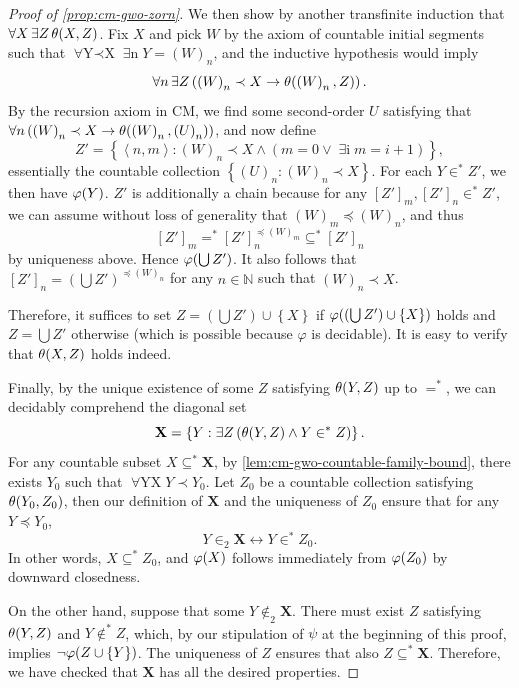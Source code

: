 \documentclass[12pt,openany]{book}
\theoremstyle{plain}
\theoremstyle{definition}
\newcommand\tuple[1]{\left\langle #1 \right\rangle}
\newcommand\opA[1]{\mathop{\forall #1}}
\newcommand\opE[1]{\mathop{\exists #1}}
\newcommand\CM{\mathrm{CM}}
\begin{document}
\begin{proof}[Proof of \autoref{prop:cm-gwo-zorn}]
  We then show by another transfinite induction that $\opA{X} \opE{Z} \theta\mleft(X, Z\mright)$. Fix $X$ and pick $W$ by the axiom of countable initial segments such that $\opA{Y \prec X} \opE{n} Y = \left(W\right)_n$, and the inductive hypothesis would imply
  \[\opA{n} \opE{Z} \left(\left(W\right)_n \prec X \rightarrow \theta\mleft(\left(W\right)_n, Z\mright)\right).\]
  By the recursion axiom in $\CM$, we find some second-order $U$ satisfying that $\opA{n} \left(\left(W\right)_n \prec X \rightarrow \theta\mleft(\left(W\right)_n, \left(U\right)_n\mright)\right)$, and now define
  \[Z' = \left\{\tuple{n, m} : \left(W\right)_n \prec X \land \left(m = 0 \lor \opE{i \in_1 \left(U\right)_n} m = i + 1\right)\right\},\]
  essentially the countable collection $\left\{\left(U\right)_n : \left(W\right)_n \prec X\right\}$. For each $Y \in^* Z'$, we then have $\varphi\mleft(Y\mright)$. $Z'$ is additionally a chain because for any $\left[Z'\right]_m, \left[Z'\right]_n \in^* Z'$, we can assume without loss of generality that $\left(W\right)_m \preceq \left(W\right)_n$, and thus
  \[\left[Z'\right]_m =^* \left[Z'\right]_n^{\preceq \left(W\right)_m} \subseteq^* \left[Z'\right]_n\]
  by uniqueness above. Hence $\varphi\mleft(\bigcup Z'\mright)$. It also follows that $\left[Z'\right]_n = \left(\bigcup Z'\right)^{\preceq \left(W\right)_n}$ for any $n \in \mathbb{N}$ such that $\left(W\right)_n \prec X$.

  Therefore, it suffices to set $Z = \left(\bigcup Z'\right) \cup \left\{X\right\}$ if $\varphi\mleft(\left(\bigcup Z'\right) \cup \left\{X\right\}\mright)$ holds and $Z = \bigcup Z'$ otherwise (which is possible because $\varphi$ is decidable). It is easy to verify that $\theta\mleft(X, Z\mright)$ holds indeed.

  Finally, by the unique existence of some $Z$ satisfying $\theta\mleft(Y, Z\mright)$ up to $=^*$, we can decidably comprehend the diagonal set
  \[\mathbf{X} = \left\{Y : \opE{Z} \left(\theta\mleft(Y, Z\mright) \land Y \in^* Z\right)\right\}.\]
  For any countable subset $X \subseteq^* \mathbf{X}$, by \autoref{lem:cm-gwo-countable-family-bound}, there exists $Y_0$ such that $\opA{Y \in^* X} Y \prec Y_0$. Let $Z_0$ be a countable collection satisfying $\theta\mleft(Y_0, Z_0\mright)$, then our definition of $\mathbf{X}$ and the uniqueness of $Z_0$ ensure that for any $Y \preceq Y_0$,
  \[Y \in_2 \mathbf{X} \leftrightarrow Y \in^* Z_0.\]
  In other words, $X \subseteq^* Z_0$, and $\varphi\mleft(X\mright)$ follows immediately from $\varphi\mleft(Z_0\mright)$ by downward closedness.

  On the other hand, suppose that some $Y \not\in_2 \mathbf{X}$. There must exist $Z$ satisfying $\theta\mleft(Y, Z\mright)$ and $Y \not\in^* Z$, which, by our stipulation of $\psi$ at the beginning of this proof, implies $\neg \varphi\mleft(Z \cup \left\{Y\right\}\mright)$. The uniqueness of $Z$ ensures that also $Z \subseteq^* \mathbf{X}$. Therefore, we have checked that $\mathbf{X}$ has all the desired properties.
\end{proof}
\end{document}
